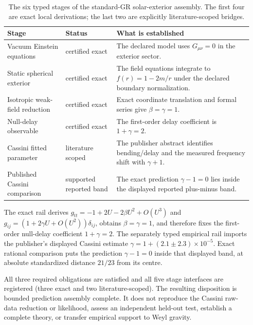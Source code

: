 \begin{table}[htbp]
\centering
\scriptsize
\begin{tabularx}{\textwidth}{@{}p{}p{}Y@{}}
\toprule
Stage & Status & What is established \\
\midrule
Vacuum Einstein equations & certified exact & The declared model uses \(G_{\mu\nu}=0\) in the exterior sector. \\
Static spherical exterior & certified exact & The field equations integrate to \(f(r)=1-2m/r\) under the declared boundary normalization. \\
Isotropic weak-field reduction & certified exact & Exact coordinate translation and formal series give \(\beta=\gamma=1\). \\
Null-delay observable & certified exact & The first-order delay coefficient is \(1+\gamma=2\). \\
Cassini fitted parameter & literature scoped & The publisher abstract identifies bending/delay and the measured frequency shift with \(\gamma+1\). \\
Published Cassini comparison & supported reported band & The exact prediction \(\gamma-1=0\) lies inside the displayed reported plus-minus band. \\
\bottomrule
\end{tabularx}
\caption{The six typed stages of the standard-GR solar-exterior assembly.  The first four are exact local derivations; the last two are explicitly literature-scoped bridges.}
\label{tab:gr-cassini-assembly}
\end{table}

The exact rail derives \(g_{tt}=-1+2U-2\beta U^2+O(U^3)\) and \(g_{ij}=(1+2\gamma U+O(U^2))\delta_{ij}\), obtains \(\beta=\gamma=1\), and therefore fixes the first-order null-delay coefficient \(1+\gamma=2\).  The separately typed empirical rail imports the publisher's displayed Cassini estimate \(\gamma=1+(2.1\mathbin{\pm}2.3)\times10^{-5}\).  Exact rational comparison puts the prediction \(\gamma-1=0\) inside that displayed band, at absolute standardized distance \(21/23\) from its centre.

All three required obligations are satisfied and all five stage interfaces are registered (three exact and two literature-scoped).  The resulting disposition is bounded prediction assembly complete.  It does not reproduce the Cassini raw-data reduction or likelihood, assess an independent held-out test, establish a complete theory, or transfer empirical support to Weyl gravity.

